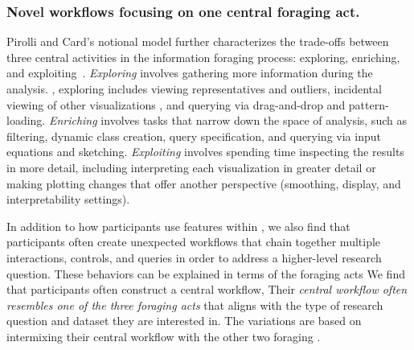 \subsubsection{Novel workflows focusing on one central foraging act.}\label{novel_workflow_foraging}
\par Pirolli and Card's notional model further characterizes the trade-offs between three central activities in the information foraging process: exploring, enriching, and exploiting~\cite{Pirolli}. \textit{Exploring} involves gathering more information during the analysis. , exploring includes viewing representatives and outliers, incidental viewing of other visualizations , and querying via drag-and-drop and pattern-loading. \textit{Enriching} involves tasks that narrow down the space of analysis, such as filtering, dynamic class creation, query specification, and querying via input equations and sketching. \textit{Exploiting} involves spending time inspecting the results in more detail, including interpreting each visualization in greater detail or making plotting changes that offer another perspective (smoothing, display, and interpretability settings). %
\par In addition to  how participants use features within , we also find that participants often create unexpected workflows that chain together multiple  interactions, controls, and queries in order to address a higher-level research question. These behaviors can be explained in terms of the foraging acts  We find that participants often construct a central workflow,  Their \emph{central workflow often resembles one of the three foraging acts} that aligns with the type of research question and dataset they are interested in. The variations are based on intermixing their central workflow with the other two foraging .
